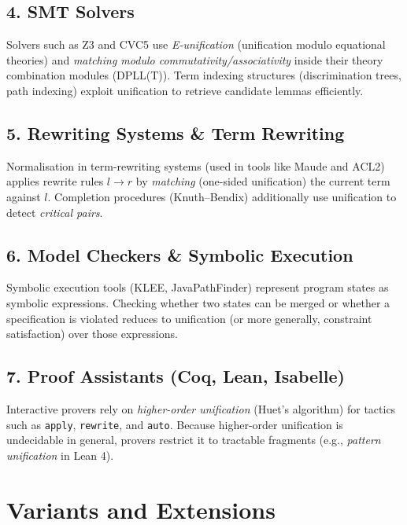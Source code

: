 \documentclass[11pt, a4paper]{article}
\begin{document}
\subsection{4. SMT Solvers}
Solvers such as Z3 and CVC5 use \emph{E-unification} (unification modulo equational
theories) and \emph{matching modulo commutativity/associativity} inside their
theory combination modules (DPLL(T)). Term indexing structures (discrimination trees,
path indexing) exploit unification to retrieve candidate lemmas efficiently.
 
\subsection{5. Rewriting Systems \& Term Rewriting}
Normalisation in term-rewriting systems (used in tools like Maude and ACL2) applies
rewrite rules $l \to r$ by \emph{matching} (one-sided unification) the current term
against $l$. Completion procedures (Knuth--Bendix) additionally use unification to
detect \emph{critical pairs}.
 
\subsection{6. Model Checkers \& Symbolic Execution}
Symbolic execution tools (KLEE, JavaPathFinder) represent program states as
symbolic expressions. Checking whether two states can be merged or whether a
specification is violated reduces to unification (or more generally, constraint
satisfaction) over those expressions.
 
\subsection{7. Proof Assistants (Coq, Lean, Isabelle)}
Interactive provers rely on \emph{higher-order unification} (Huet's algorithm) for
tactics such as \texttt{apply}, \texttt{rewrite}, and \texttt{auto}. Because
higher-order unification is undecidable in general, provers restrict it to
tractable fragments (e.g., \emph{pattern unification} in Lean 4).
 
\section{Variants and Extensions}
 
\end{document}
